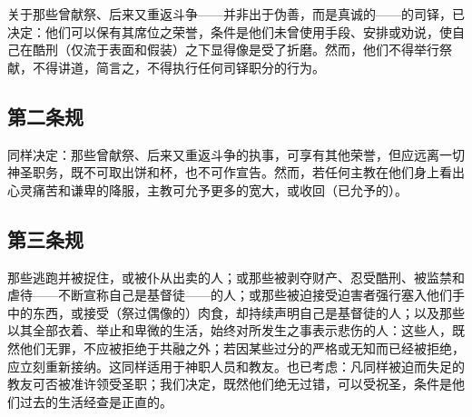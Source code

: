 关于那些曾献祭、后来又重返斗争——并非出于伪善，而是真诚的——的司铎，已决定：他们可以保有其席位之荣誉，条件是他们未曾使用手段、安排或劝说，使自己在酷刑（仅流于表面和假装）之下显得像是受了折磨。然而，他们不得举行祭献，不得讲道，简言之，不得执行任何司铎职分的行为。\par

\par


\subsection{第二条规}

同样决定：那些曾献祭、后来又重返斗争的执事，可享有其他荣誉，但应远离一切神圣职务，既不可取出饼和杯，也不可作宣告。然而，若任何主教在他们身上看出心灵痛苦和谦卑的降服，主教可允予更多的宽大，或收回（已允予的）。\par


\subsection{第三条规}

那些逃跑并被捉住，或被仆从出卖的人；或那些被剥夺财产、忍受酷刑、被监禁和虐待——不断宣称自己是基督徒——的人；或那些被迫接受迫害者强行塞入他们手中的东西，或接受（祭过偶像的）肉食，却持续声明自己是基督徒的人；以及那些以其全部衣着、举止和卑微的生活，始终对所发生之事表示悲伤的人：这些人，既然他们无罪，不应被拒绝于共融之外；若因某些过分的严格或无知而已经被拒绝，应立刻重新接纳。这同样适用于神职人员和教友。也已考虑：凡同样被迫而失足的教友可否被准许领受圣职；我们决定，既然他们绝无过错，可以受祝圣，条件是他们过去的生活经查是正直的。\par

\par

